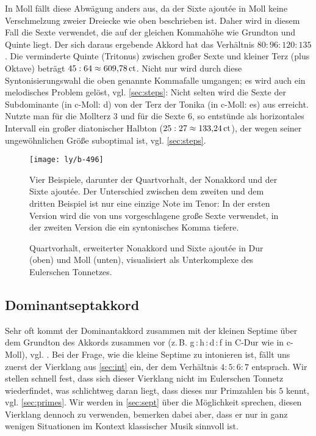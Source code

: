 In Moll fällt diese Abwägung anders aus, da der Sixte ajoutée in Moll keine
Verschmelzung zweier Dreiecke wie oben beschrieben ist.  Daher wird in diesem
Fall die Sexte verwendet, die auf der gleichen Kommahöhe wie Grundton und Quinte
liegt. Der sich daraus ergebende Akkord hat das Verhältnis $80:96:120:135$.  Die
verminderte Quinte (Tritonus) zwischen großer Sexte und kleiner Terz (plus
Oktave) beträgt $45:64\approx 609{,}78\,\text{ct}$.  Nicht nur wird durch diese
Syntonisierungswahl die oben genannte Kommafalle umgangen; es wird auch ein
melodisches Problem gelöst, vgl. \cref{sec:steps}: Nicht selten wird die Sexte
der Subdominante (in c-Moll: d) von der Terz der Tonika (in c-Moll: es) aus
erreicht.  Nutzte man für die Mollterz \flatp $3$ und für die Sexte \naturalp
$6$, so entstünde als horizontales Intervall ein großer diatonischer Halbton
($25:27\approx 133{,}24\,\text{ct}$), der wegen seiner ungewöhnlichen Größe suboptimal
ist, vgl. \cref{sec:steps}.


\begin{figure}
  \centering
  \texttt{[image: ly/b-496]}
  \caption{Vier Beispiele, darunter der Quartvorhalt, der Nonakkord und der
    Sixte ajoutée. Der Unterschied zwischen dem zweiten und dem dritten Beispiel
    ist nur eine einzige Note im Tenor: In der ersten Version wird die von uns
    vorgeschlagene große Sexte verwendet, in der zweiten Version die ein
    syntonisches Komma tiefere.}\label{fig:496}
\end{figure}

\begin{figure}
  \centering
  
  \caption{Quartvorhalt, erweiterter Nonakkord und Sixte ajoutée in Dur (oben)
    und Moll (unten), visualisiert als Unterkomplexe des Eulerschen
    Tonnetzes.}\label{fig:chordLines}
\end{figure}

\subsection{Dominantseptakkord}
\label{sec:dom7syn}

Sehr oft kommt der Dominantakkord zusammen mit der kleinen Septime über dem
Grundton des Akkords zusammen vor (z.\,B. g\,:\,h\,:\,d\,:\,f in C-Dur wie in
c-Moll), vgl. \cite[{}9.1]{Skript}.  Bei der Frage, wie die kleine Septime zu
intonieren ist, fällt uns zuerst der Vierklang aus \cref{sec:int} ein, der dem
Verhältnis $4:5:6:7$ entsprach. Wir stellen schnell fest, dass sich dieser
Vierklang nicht im Eulerschen Tonnetz wiederfindet, was schlichtweg daran liegt,
dass dieses nur Primzahlen bis $5$ kennt, vgl. \cref{sec:primes}.  Wir werden in
\cref{sec:sept} über die Möglichkeit sprechen, diesen Vierklang dennoch zu
verwenden, bemerken dabei aber, dass er nur in ganz wenigen Situationen im
Kontext klassischer Musik sinnvoll ist.

